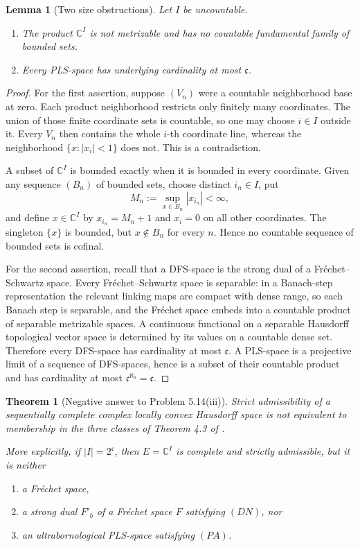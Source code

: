 \documentclass[11pt]{article}
\newtheorem{theorem}{Theorem}
\newtheorem{lemma}{Lemma}
\newcommand{\C}{\mathbb C}
\newcommand{\cC}{\mathfrak c}
\begin{document}
\begin{lemma}[Two size obstructions]\label{lem:obstructions}
Let $I$ be uncountable.
\begin{enumerate}
\item The product $\C^I$ is not metrizable and has no countable fundamental
family of bounded sets.
\item Every PLS-space has underlying cardinality at most $\cC$.
\end{enumerate}
\end{lemma}

\begin{proof}
For the first assertion, suppose $(V_n)$ were a countable neighborhood base at
zero.  Each product neighborhood restricts only finitely many coordinates.
The union of those finite coordinate sets is countable, so one may choose
$i\in I$ outside it.  Every $V_n$ then contains the whole $i$-th coordinate
line, whereas the neighborhood $\{x:|x_i|<1\}$ does not.  This is a
contradiction.

A subset of $\C^I$ is bounded exactly when it is bounded in every coordinate.
Given any sequence $(B_n)$ of bounded sets, choose distinct $i_n\in I$, put
\[
       M_n:=\sup_{x\in B_n}|x_{i_n}|<\infty,
\]
and define $x\in\C^I$ by $x_{i_n}=M_n+1$ and $x_i=0$ on all other
coordinates.  The singleton $\{x\}$ is bounded, but $x\notin B_n$ for every
$n$.  Hence no countable sequence of bounded sets is cofinal.

For the second assertion, recall that a DFS-space is the strong dual of a
Fr\'echet--Schwartz space.  Every Fr\'echet--Schwartz space is separable: in a
Banach-step representation the relevant linking maps are compact with dense
range, so each Banach step is separable, and the Fr\'echet space embeds into a
countable product of separable metrizable spaces.  A continuous functional on
a separable Hausdorff topological vector space is determined by its values on
a countable dense set.  Therefore every DFS-space has cardinality at most
$\cC$.  A PLS-space is a projective limit of a sequence of DFS-spaces, hence
is a subset of their countable product and has cardinality at most
$\cC^{\aleph_0}=\cC$.
\end{proof}

\begin{theorem}[Negative answer to Problem 5.14(iii)]\label{thm:main}
Strict admissibility of a sequentially complete complex locally convex
Hausdorff space is not equivalent to membership in the three classes of
Theorem 4.3 of \cite{Kruse}.

More explicitly, if $|I|=2^{\cC}$, then $E=\C^I$ is complete and strictly
admissible, but it is neither
\begin{enumerate}
\item a Fr\'echet space,
\item a strong dual $F'_b$ of a Fr\'echet space $F$ satisfying $(DN)$, nor
\item an ultrabornological PLS-space satisfying $(PA)$.
\end{enumerate}
\end{theorem}
\end{document}
